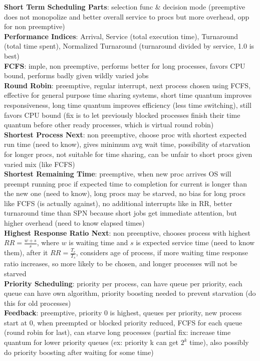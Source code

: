 \documentclass[a4paper]{article}
\begin{document}
\begin{multicols}{2}
        \textbf{Short Term Scheduling Parts}: selection func \& decision mode (preemptive does not monopolize and better overall service to procs but more overhead, opp for non preemptive)\\
        \textbf{Performance Indices}: Arrival, Service (total execution time), Turnaround (total time spent), Normalized Turnaround (turnaround divided by service, 1.0 is best)\\
        \textbf{FCFS}: imple, non preemptive, performs better for long processes, favors CPU bound, performs badly given wildly varied jobs\\
        \textbf{Round Robin}: preemptive, regular interrupt, next process chosen using FCFS, effective for general purpose time sharing systems, short time quantum improves responsiveness, long time quantum improves efficiency (less time switching), still favors CPU bound (fix is to let previously blocked processes finish their time quantum before other ready processes, which is virtual round robin)\\
        \textbf{Shortest Process Next}: non preemptive, choose proc with shortest expected run time (need to know), gives minimum avg wait time, possibility of starvation for longer procs, not suitable for time sharing, can be unfair to short procs given varied mix (like FCFS)\\
        \textbf{Shortest Remaining Time}: preemptive, when new proc arrives OS will preempt running proc if expected time to completion for current is longer than the new one (need to know), long procs may be starved, no bias for long procs like FCFS (is actually against), no additional interrupts like in RR, better turnaround time than SPN because short jobs get immediate attention, but higher overhead (need to know elapsed times)\\
        \textbf{Highest Response Ratio Next}: non preenptive, chooses process with highest $RR = \frac{w+s}{s}$, where $w$ is waiting time and $s$ is expected service time (need to know them), after it $RR = \frac{T_r}{T_s}$, considers age of process, if more waiting time response ratio increases, so more likely to be chosen, and longer processes will not be starved\\
        \textbf{Priority Scheduling}: priority per process, can have queue per priority, each queue can have own algorithm, priority boosting needed to prevent starvation (do this for old processes)\\
        \textbf{Feedback}: preemptive, priority 0 is highest, queues per priority, new process start at 0, when preempted or blocked priority reduced, FCFS for each queue (round robin for last), can starve long processes (partial fix: increase time quantum for lower priority queues (ex: priority k can get $2^k$ time), also possibly do priority boosting after waiting for some time)\\

\end{multicols}
\end{document}
